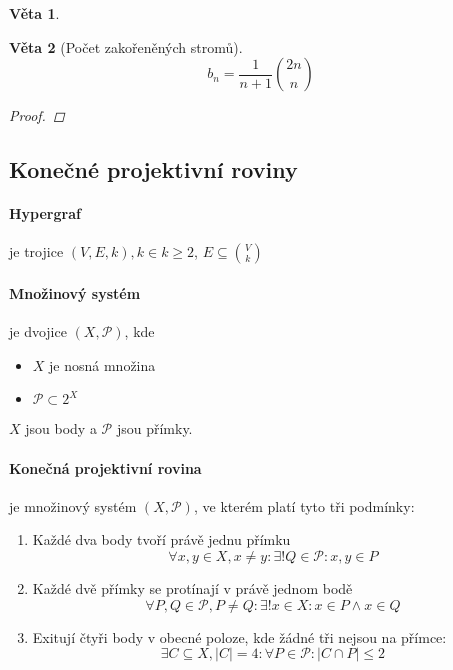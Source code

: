 \documentclass[10pt,a4paper]{article}
\theoremstyle{plain}
\newtheorem*{veta}{Věta}
\begin{document}
\begin{veta}
	\[  \]
\end{veta}

\begin{veta}[Počet zakořeněných stromů]
	\[b_n = \frac{1}{n+1} \binom{2n}{n} \]
	\begin{proof}
	
	\end{proof}
\end{veta}



\subsection{Konečné projektivní roviny}

\paragraph{Hypergraf} je trojice $(V,E, k), k \in k \geq 2$, $E \subseteq \binom{V}{k}$

\paragraph{Množinový systém} je dvojice $(X, \mathcal{P})$, kde \begin{itemize}
\item $X$ je nosná množina
\item $\mathcal{P} \subset 2^X$
\end{itemize}
$X$ jsou body a $\mathcal{P}$ jsou přímky.

\paragraph{Konečná projektivní rovina} je množinový systém $(X, \mathcal{P})$, ve kterém platí tyto tři podmínky: 
\begin{enumerate}[label=(A\arabic*)]
\item Každé dva body tvoří právě jednu přímku
\[\forall x,y \in X, x \neq y: \exists! Q \in \mathcal{P}: x,y \in P \]
\item Každé dvě přímky se protínají v právě jednom bodě
\[\forall P,Q \in \mathcal{P}, P \neq Q: \exists! x \in X: x \in P \wedge x \in Q \]
\item Exitují čtyři body v obecné poloze, kde žádné tři nejsou na přímce:
\[ \exists C \subseteq X, |C| = 4: \forall P \in \mathcal{P}: |C \cap P| \leq 2 \]
\end{enumerate}
\end{document}
